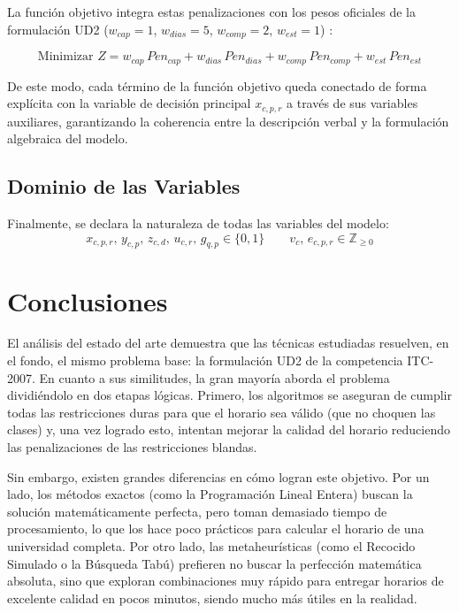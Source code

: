 \documentclass[letter, 10pt]{article}
\begin{document}
La función objetivo integra estas penalizaciones con los pesos oficiales de la formulación UD2 ($w_{cap}=1$, $w_{dias}=5$, $w_{comp}=2$, $w_{est}=1$) \cite{digaspero2007}:

\begin{equation}
\text{Minimizar } Z = w_{cap}\, Pen_{cap} + w_{dias}\, Pen_{dias} + w_{comp}\, Pen_{comp} + w_{est}\, Pen_{est}
\end{equation}

De este modo, cada término de la función objetivo queda conectado de forma explícita con la variable de decisión principal $x_{c,p,r}$ a través de sus variables auxiliares, garantizando la coherencia entre la descripción verbal y la formulación algebraica del modelo.

\subsection{Dominio de las Variables}
Finalmente, se declara la naturaleza de todas las variables del modelo:
\begin{equation}
x_{c,p,r},\, y_{c,p},\, z_{c,d},\, u_{c,r},\, g_{q,p} \in \{0,1\}
\qquad
v_c,\, e_{c,p,r} \in \mathbb{Z}_{\geq 0}
\end{equation}
\section{Conclusiones}

El análisis del estado del arte demuestra que las técnicas estudiadas resuelven, en el fondo, el mismo problema base: la formulación UD2 de la competencia ITC-2007. En cuanto a sus similitudes, la gran mayoría aborda el problema dividiéndolo en dos etapas lógicas. Primero, los algoritmos se aseguran de cumplir todas las restricciones duras para que el horario sea válido (que no choquen las clases) y, una vez logrado esto, intentan mejorar la calidad del horario reduciendo las penalizaciones de las restricciones blandas.

Sin embargo, existen grandes diferencias en cómo logran este objetivo. Por un lado, los métodos exactos (como la Programación Lineal Entera) buscan la solución matemáticamente perfecta, pero toman demasiado tiempo de procesamiento, lo que los hace poco prácticos para calcular el horario de una universidad completa. Por otro lado, las metaheurísticas (como el Recocido Simulado o la Búsqueda Tabú) prefieren no buscar la perfección matemática absoluta, sino que exploran combinaciones muy rápido para entregar horarios de excelente calidad en pocos minutos, siendo mucho más útiles en la realidad.
\end{document}
